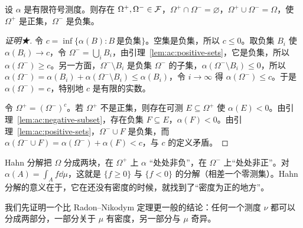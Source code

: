 \begin{theorem}[Hahn 分解]\label{thm:ac:hahn}
设 $\alpha$ 是有限符号测度。则存在 $\Omega^+,\Omega^-\in\mathcal{F}$，$\Omega^+\cap\Omega^-=\varnothing$，$\Omega^+\cup\Omega^-=\Omega$，使 $\Omega^+$ 是正集，$\Omega^-$ 是负集。
\end{theorem}
\begin{proof}[证明★]
令 $c=\inf\{\alpha(B):B\ \text{是负集}\}$。空集是负集，所以 $c\leqslant0$。取负集 $B_i$ 使 $\alpha(B_i)\to c$，令 $\Omega^-=\bigcup_iB_i$，由引理~\ref{lem:ac:positive-sets}，它是负集，所以 $\alpha(\Omega^-)\geqslant c$。另一方面，$\Omega^-\setminus B_i$ 是负集 $\Omega^-$ 的子集，$\alpha(\Omega^-\setminus B_i)\leqslant0$，所以 $\alpha(\Omega^-)=\alpha(B_i)+\alpha(\Omega^-\setminus B_i)\leqslant\alpha(B_i)$，令 $i\to\infty$ 得 $\alpha(\Omega^-)\leqslant c$。于是 $\alpha(\Omega^-)=c$，特别地 $c$ 是有限的实数。

令 $\Omega^+=(\Omega^-)^c$。若 $\Omega^+$ 不是正集，则存在可测 $E\subseteq\Omega^+$ 使 $\alpha(E)<0$。由引理~\ref{lem:ac:negative-subset}，存在负集 $F\subseteq E$，$\alpha(F)<0$。由引理~\ref{lem:ac:positive-sets}，$\Omega^-\cup F$ 是负集，而 $\alpha(\Omega^-\cup F)=\alpha(\Omega^-)+\alpha(F)<c$，与 $c$ 的定义矛盾。
\end{proof}

Hahn 分解把 $\Omega$ 分成两块，在 $\Omega^+$ 上 $\alpha$ “处处非负”，在 $\Omega^-$ 上“处处非正”。对 $\alpha(A)=\int_Af\dd\mu$，这就是 $\{f\geqslant0\}$ 与 $\{f<0\}$ 的分解（相差一个零测集）。Hahn 分解的意义在于，它在还没有密度的时候，就找到了“密度为正的地方”。


我们先证明一个比 Radon--Nikodym 定理更一般的结论：任何一个测度 $\nu$ 都可以分成两部分，一部分关于 $\mu$ 有密度，另一部分与 $\mu$ 奇异。

